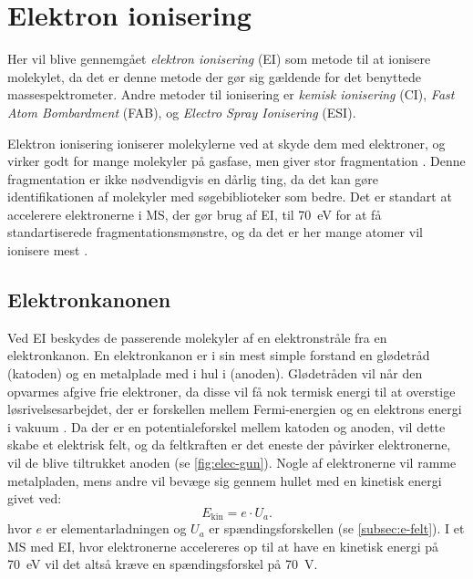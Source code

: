 \section{Elektron ionisering}\label{sec:electronion}
Her vil blive gennemgået \emph{elektron ionisering} (EI) som metode til at ionisere molekylet, da det er denne metode der gør sig gældende for det benyttede massespektrometer. %
Andre metoder til ionisering er \emph{kemisk ionisering} (CI), \emph{Fast Atom Bombardment} (FAB), og \emph{Electro Spray Ionisering} (ESI)\space\parencite{msionization}.
\par Elektron ionisering ioniserer molekylerne ved at skyde dem med elektroner, og virker godt for mange molekyler på gasfase, men giver stor fragmentation \parencite{massspec}.
Denne fragmentation er ikke nødvendigvis en dårlig ting, da det kan gøre identifikationen af molekyler med søgebiblioteker som \cite{nist23} bedre.
Det er standart at accelerere elektronerne i MS, der gør brug af EI, til \qty{70}{\eV} for at få standartiserede fragmentationsmønstre, og da det er her mange atomer vil ionisere mest \parencite{massspec}.
\subsection{Elektronkanonen}

Ved EI beskydes de passerende molekyler af en elektronstråle fra en elektronkanon.
En elektronkanon er i sin mest simple forstand en glødetråd (katoden) og en metalplade med i hul i (anoden)\space\parencite{orbitAstx}.
Glødetråden vil når den opvarmes afgive frie elektroner, da disse vil få nok termisk energi til at overstige løsrivelsesarbejdet, der er forskellen mellem Fermi-energien\footnotemark{} og en elektrons energi i vakuum \parencite{electronmicroscopy}.
Da der er en potentialeforskel mellem katoden og anoden, vil dette skabe et elektrisk felt, og da feltkraften er det eneste der påvirker elektronerne, vil de blive tiltrukket anoden (se \cref{fig:elec-gun}).
Nogle af elektronerne vil ramme metalpladen, mens andre vil bevæge sig gennem hullet med en kinetisk energi givet ved:
\begin{equation}
	E_{\text{kin}} = e \cdot U_a .
\end{equation}
hvor $e$ er elementarladningen og $U_a$ er spændingsforskellen (se \cref{subsec:e-felt})\space\parencite{grundfysA}.
I et MS med EI, hvor elektronerne accelereres op til at have en kinetisk energi på \qty{70}{\eV} vil det altså kræve en spændingsforskel på \qty{70}{\volt}.
